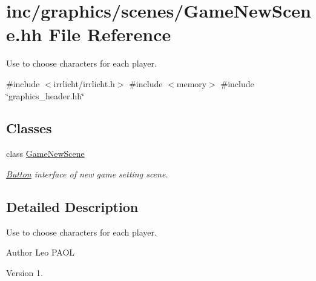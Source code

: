 \hypertarget{GameNewScene_8hh}{}\section{inc/graphics/scenes/\+Game\+New\+Scene.hh File Reference}
\label{GameNewScene_8hh}


Use to choose characters for each player.  


{\ttfamily \#include $<$irrlicht/irrlicht.\+h$>$}\newline
{\ttfamily \#include $<$memory$>$}\newline
{\ttfamily \#include \char`\"{}graphics\+\_\+header.\+hh\char`\"{}}\newline
\subsection*{Classes}
\begin{DoxyCompactItemize}
\item 
class \hyperlink{classGameNewScene}{Game\+New\+Scene}
\begin{DoxyCompactList}\small\item\em \hyperlink{classButton}{Button} interface of new game setting scene. \end{DoxyCompactList}\end{DoxyCompactItemize}


\subsection{Detailed Description}
Use to choose characters for each player. 

\begin{DoxyAuthor}{Author}
Leo P\+A\+OL 
\end{DoxyAuthor}
\begin{DoxyVersion}{Version}
1. 
\end{DoxyVersion}
